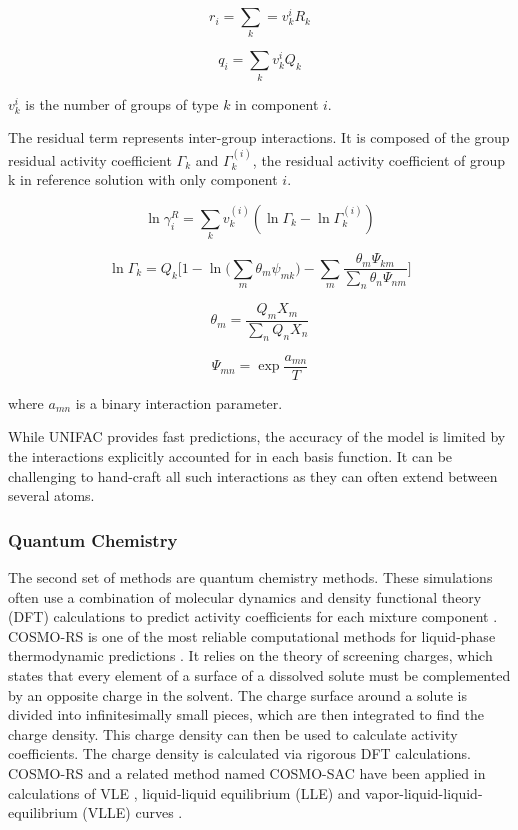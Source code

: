 \begin{equation}
    r_i  = \sum_k = v_k^i R_k
\end{equation}

\begin{equation}
    q_i = \sum_k v_k^i Q_k
\end{equation}

$v_k^i$ is the number of groups of type $k$ in component $i$.

The residual term represents inter-group interactions. It is composed of the group residual activity coefficient $\Gamma_k$ and  $\Gamma_k^{(i)}$, the residual activity coefficient of group k in reference solution with only component $i$.

\begin{equation}
    \ln \gamma^R_i = \sum_k v_k^{(i)}(\ln \Gamma_k - \ln \Gamma_k^{(i)})
\end{equation}

\begin{equation}
    \ln \Gamma_k = Q_k \biggl[1 - \ln \bigl(\sum_m \theta_m \psi_{mk}\bigr) - \sum_m \frac{\theta_m \Psi_{km}}{\sum_n \theta_n \Psi_{nm}} \biggr]
\end{equation}

\begin{equation}
    \theta_m = \frac{Q_m X_m}{\sum_n Q_n X_n}
\end{equation}

\begin{equation}
    \Psi_{mn} = \exp{\frac{a_{mn}}{T}}
\end{equation}

where $a_{mn}$ is a binary interaction parameter. 

While UNIFAC provides fast predictions, the accuracy of the model is limited by the interactions explicitly accounted for in each basis function. It can be challenging to hand-craft all such interactions as they can often extend between several atoms.

\subsubsection{Quantum Chemistry}

The second set of methods are quantum chemistry methods. These simulations often use a combination of molecular dynamics and density functional theory (DFT) calculations to predict activity coefficients for each mixture component \cite{Constantinescu2005}. COSMO-RS is one of the most reliable computational methods for liquid-phase thermodynamic predictions \cite{Klamt1995, Klamt2010}. It relies on the theory of screening charges, which states that every element of a surface of a dissolved solute must be complemented by an opposite charge in the solvent. The charge surface around a solute is divided into infinitesimally small pieces, which are then integrated to find the charge density. This charge density can then be used to calculate activity coefficients. The charge density is calculated via rigorous DFT calculations. COSMO-RS and a related method named COSMO-SAC have been applied in calculations of VLE \cite{Constantinescu2005}, liquid-liquid equilibrium (LLE) \cite{Dechambre2014} and vapor-liquid-liquid-equilibrium (VLLE) curves \cite{Kundu2011}.


